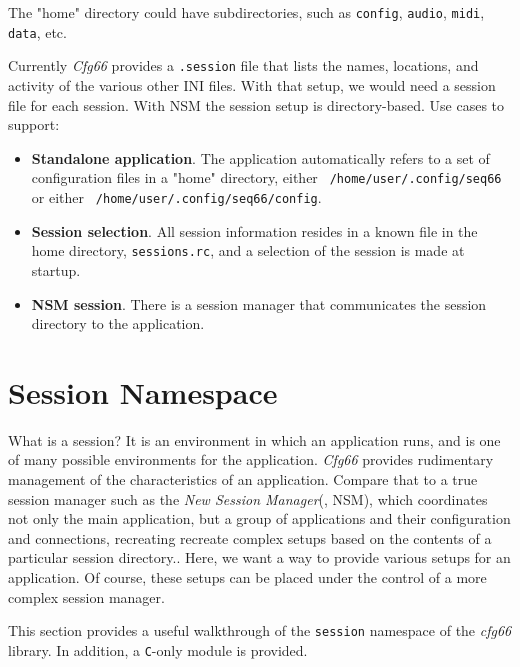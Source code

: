    The "home" directory could have subdirectories, such as
   \texttt{config}, \texttt{audio}, \texttt{midi}, \texttt{data}, etc.

   Currently \textsl{Cfg66} provides a \texttt{.session} file that lists
   the names, locations, and activity of the various other INI files.
   With that setup, we would need a session file for each session.
   With NSM the session setup is directory-based.
   Use cases to support:

   \begin{itemize}
      \item \textbf{Standalone application}.
         The application automatically refers to a set of configuration files
         in a "home" directory,
         either \texttt{~/home/user/.config/seq66} or
         either \texttt{~/home/user/.config/seq66/config}.
      \item \textbf{Session selection}.
         All session information resides in a known file in the home
         directory, \texttt{sessions.rc}, and a selection of the session
         is made at startup.
      \item \textbf{NSM session}.
         There is a session manager that communicates the session directory
         to the application.
   \end{itemize}

\section{Session Namespace}
\label{sec:session_namespace}

   What is a session?
   It is an environment in which an application runs, and is one of many
   possible environments for the application.
   \textsl{Cfg66} provides rudimentary management of the characteristics of
   an application. Compare that to a true session manager such as the
   \textsl{New Session Manager}(\cite{nsm}, NSM), which coordinates not only
   the main application, but a group of applications and their configuration
   and connections, recreating recreate complex setups based on the
   contents of a particular session directory..
   Here, we want a way to provide various setups for an application.
   Of course, these setups can be placed under the control of a more complex
   session manager.

   This section provides a useful walkthrough of the \texttt{session} namespace of
   the \textsl{cfg66} library.
   In addition, a \texttt{C}-only module is provided.


